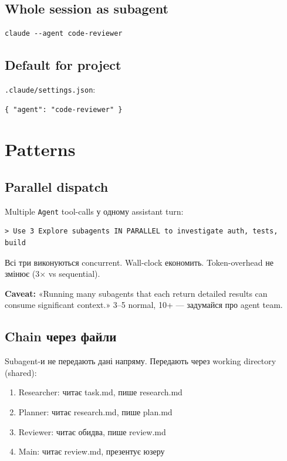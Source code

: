 \documentclass[11pt,a4paper]{article}
\begin{document}
\subsection{Whole session as subagent}
\begin{lstlisting}
claude --agent code-reviewer
\end{lstlisting}

\subsection{Default for project}
\texttt{.claude/settings.json}:
\begin{lstlisting}
{ "agent": "code-reviewer" }
\end{lstlisting}

\section{Patterns}

\subsection{Parallel dispatch}

Multiple \texttt{Agent} tool-calls у одному assistant turn:

\begin{lstlisting}
> Use 3 Explore subagents IN PARALLEL to investigate auth, tests, build
\end{lstlisting}

Всі три виконуються concurrent. Wall-clock економить. Token-overhead не змінює (3$\times$ vs sequential).

\textbf{Caveat:} «Running many subagents that each return detailed results can consume significant context.» 3--5 normal, 10+ --- задумайся про agent team.

\subsection{Chain через файли}

Subagent-и не передають дані напряму. Передають через working directory (shared):

\begin{enumerate}
  \item Researcher: читає task.md, пише research.md
  \item Planner: читає research.md, пише plan.md
  \item Reviewer: читає обидва, пише review.md
  \item Main: читає review.md, презентує юзеру
\end{enumerate}
\end{document}
